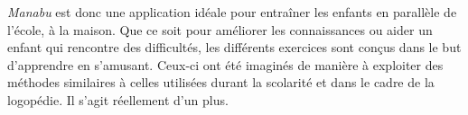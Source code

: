\textit{Manabu} est donc une application idéale pour entraîner les enfants en parallèle de l'école, à la maison. Que ce soit pour améliorer les connaissances ou aider un enfant qui rencontre des difficultés, les différents exercices sont conçus dans le but d'apprendre en s'amusant. Ceux-ci ont été imaginés de manière à exploiter des méthodes similaires à celles utilisées durant la scolarité et dans le cadre de la logopédie. Il s'agit réellement d'un plus.



